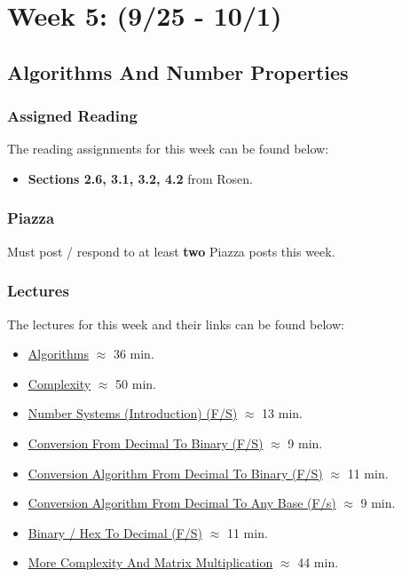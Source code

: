 \clearpage
\chapter{Week 5: (9/25 - 10/1)}

\section{Algorithms And Number Properties}

\subsection{Assigned Reading}

The reading assignments for this week can be found below:

\begin{itemize}
    \item \textbf{Sections 2.6, 3.1, 3.2, 4.2} from Rosen.
\end{itemize}

\subsection{Piazza}

Must post / respond to at least \textbf{two} Piazza posts this week.  

\subsection{Lectures}

The lectures for this week and their links can be found below:

\begin{itemize}
    \item \href{https://applied.cs.colorado.edu/mod/hvp/view.php?id=51632}{Algorithms} $\approx$ 36 min.
    \item \href{https://applied.cs.colorado.edu/mod/hvp/view.php?id=51633}{Complexity} $\approx$ 50 min.
    \item \href{https://applied.cs.colorado.edu/mod/hvp/view.php?id=51634}{Number Systems (Introduction) (F/S)} $\approx$ 13 min.
    \item \href{https://applied.cs.colorado.edu/mod/hvp/view.php?id=51635}{Conversion From Decimal To Binary (F/S)} $\approx$ 9 min.
    \item \href{https://applied.cs.colorado.edu/mod/hvp/view.php?id=51636}{Conversion Algorithm From Decimal To Binary (F/S)} $\approx$ 11 min.
    \item \href{https://applied.cs.colorado.edu/mod/hvp/view.php?id=51637}{Conversion Algorithm From Decimal To Any Base (F/s)} $\approx$ 9 min.
    \item \href{https://applied.cs.colorado.edu/mod/hvp/view.php?id=51638}{Binary / Hex To Decimal (F/S)} $\approx$ 11 min.
    \item \href{https://applied.cs.colorado.edu/mod/hvp/view.php?id=51639}{More Complexity And Matrix Multiplication} $\approx$ 44 min.
\end{itemize}

